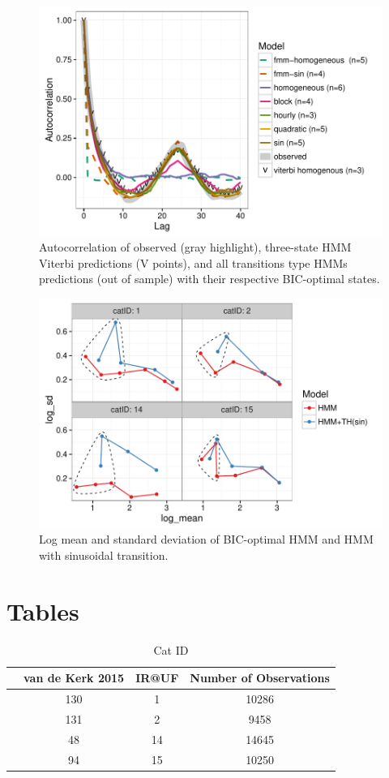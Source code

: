 \documentclass{bmcart}
\begin{document}
\begin{backmatter}
\begin{figure}[h!]
   \includegraphics[width=5in]{figure/acf_plot-1}
  \caption{ Autocorrelation of observed (gray highlight), three-state HMM Viterbi predictions (V points), and all transitions type HMMs predictions (out of sample) with their respective BIC-optimal states.}
      \end{figure}
      
\begin{figure}[h!]
   \includegraphics[width=5in]{figure/r_msdlist-1}
  \caption{ Log mean and standard deviation of BIC-optimal HMM and HMM with sinusoidal transition.}
      \end{figure}
      
\section*{Tables}
\begin{table}[h!]
\caption{Cat ID}
      \begin{tabular}{cccc}
        \hline
           & van de Kerk 2015  & IR@UF   & Number of Observations\\ \hline
         & 130 & 1 & 10286\\
         & 131 & 2  & 9458\\
         & 48 & 14  & 14645\\
         & 94  & 15   & 10250\\ \hline
      \end{tabular}
\end{table}

\end{backmatter}
\end{document}

